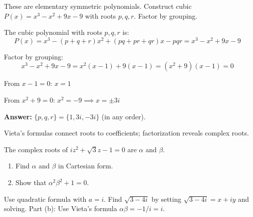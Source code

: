 \vspace{0.5cm}
\begin{hintbox}
These are elementary symmetric polynomials. Construct cubic $P(x) = x^3 - x^2 + 9x - 9$ with roots $p, q, r$. Factor by grouping.
\end{hintbox}

\begin{solution}
The cubic polynomial with roots $p, q, r$ is:
$$
P(x) = x^3 - (p+q+r)x^2 + (pq+pr+qr)x - pqr = x^3 - x^2 + 9x - 9
$$

Factor by grouping:
$$
x^3 - x^2 + 9x - 9 = x^2(x-1) + 9(x-1) = (x^2+9)(x-1) = 0
$$

From $x-1=0$: $x=1$

From $x^2+9=0$: $x^2 = -9 \implies x = \pm 3i$

\textbf{Answer:} $\{p,q,r\} = \{1, 3i, -3i\}$ (in any order).
\end{solution}

\begin{takeaways}
Vieta's formulas connect roots to coefficients; factorization reveals complex roots.
\end{takeaways}

\vspace{1cm}

\begin{problem}
The complex roots of $iz^2 + \sqrt{3}z - 1 = 0$ are $\alpha$ and $\beta$.
\begin{enumerate}
    \item Find $\alpha$ and $\beta$ in Cartesian form.
    \item Show that $\alpha^2\beta^2 + 1 = 0$.
\end{enumerate}
\end{problem}

\vspace{0.5cm}
\begin{hintbox}
Use quadratic formula with $a=i$. Find $\sqrt{3-4i}$ by setting $\sqrt{3-4i}=x+iy$ and solving. Part (b): Use Vieta's formula $\alpha\beta = -1/i = i$.
\end{hintbox}

